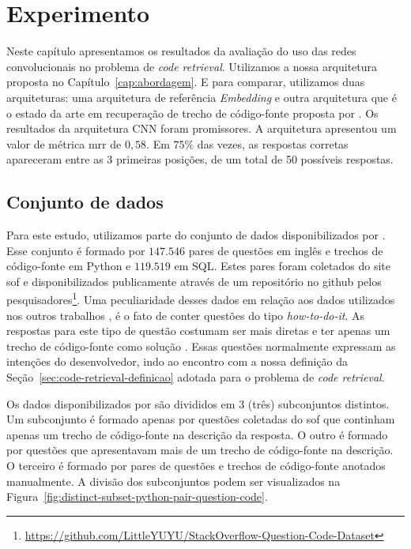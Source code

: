 \chapter{Experimento}
\label{cap:experimento}

Neste capítulo apresentamos os resultados da avaliação do uso das redes convolucionais no problema de \textit{code retrieval}. Utilizamos a nossa arquitetura proposta no Capítulo~\ref{cap:abordagem}. E para comparar, utilizamos duas arquiteturas: uma arquitetura de referência \textit{Embedding} e outra arquitetura que é o estado da arte em recuperação de trecho de código-fonte proposta por \cite{cambronero-deep-learning-code-search:2019}. Os resultados da arquitetura CNN foram promissores. A arquitetura apresentou um valor de métrica \acrfull{mrr} de $0,58$.  Em $75\%$ das vezes, as respostas corretas apareceram entre as 3 primeiras posições, de um total de 50 possíveis respostas. 

\section{Conjunto de dados}
\label{sec:conjunto-dados}

Para este estudo, utilizamos parte do conjunto de dados disponibilizados por \cite{yao-2018}. Esse conjunto é formado por $\bm{147.546}$ pares de questões em inglês e trechos de código-fonte em Python e $\bm{119.519}$ em SQL. Estes pares foram coletados do site \Gls{sof} e disponibilizados publicamente através de um repositório no \Gls{github} pelos pesquisadores\footnote{\url{https://github.com/LittleYUYU/StackOverflow-Question-Code-Dataset}}. Uma peculiaridade desses dados em relação aos dados utilizados nos outros trabalhos \cite{iyer-etal-2016-summarizing, Allamanis-bimodal-source-code-natural-language:2015}, é o fato de conter questões do tipo \textit{how-to-do-it}. As respostas para este tipo de questão costumam ser mais diretas e ter apenas um trecho de código-fonte como solução \citep{yao-2018}. Essas questões normalmente expressam as intenções do desenvolvedor, indo ao encontro com a nossa definição da Seção~\ref{sec:code-retrieval-definicao} adotada para o problema de \textit{code retrieval}.

Os dados disponibilizados por \cite{yao-2018} são divididos em 3 (três) subconjuntos distintos. Um subconjunto é formado apenas por questões coletadas do \Gls{sof} que continham apenas um trecho de código-fonte na descrição da resposta. O outro é formado por questões que apresentavam mais de um trecho de código-fonte na descrição. O terceiro é formado por pares de questões e trechos de código-fonte anotados manualmente. A divisão dos subconjuntos podem ser visualizados na Figura~\ref{fig:distinct-subset-python-pair-question-code}.

